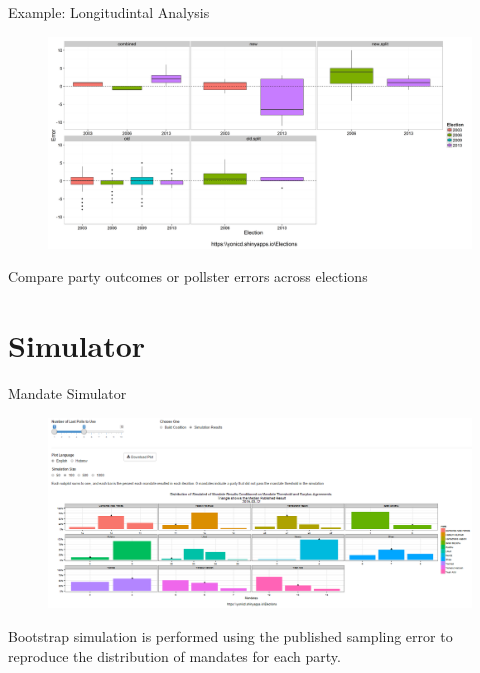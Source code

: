 \documentclass[11pt]{beamer}
\begin{document}
\begin{frame}{Example: Longitudintal Analysis}				
				\begin{figure}[h]
					\centering
					\includegraphics[width=1\linewidth]{../www/ElectionPlot_longitudinal}					\label{fig:ElectionPlot_longitudinal}
				\end{figure}
\begin{block}{Compare party outcomes or pollster errors across elections}\end{block}
\end{frame}

\section{Simulator}
\begin{frame}{Mandate Simulator}
\begin{figure}				
					\centering
					\includegraphics[width=1\linewidth]{../www/sim_screen_grab}
					\label{fig:sim_screen_grab}
				\end{figure}
			\begin{block}{Bootstrap simulation is performed using the published sampling error to reproduce the distribution of mandates for each party.}
			\end{block}
\end{frame}
\end{document}
